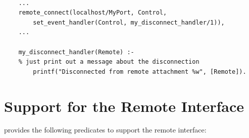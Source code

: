 \begin{verbatim}

    ...
    remote_connect(localhost/MyPort, Control, 
        set_event_handler(Control, my_disconnect_handler/1)),
    ...

    my_disconnect_handler(Remote) :-  
    % just print out a message about the disconnection
        printf("Disconnected from remote attachment %w", [Remote]).

\end{verbatim}


\section{Support for the Remote Interface}
\label{remotesupport}

{\eclipse} provides the following predicates to support the remote
interface:

